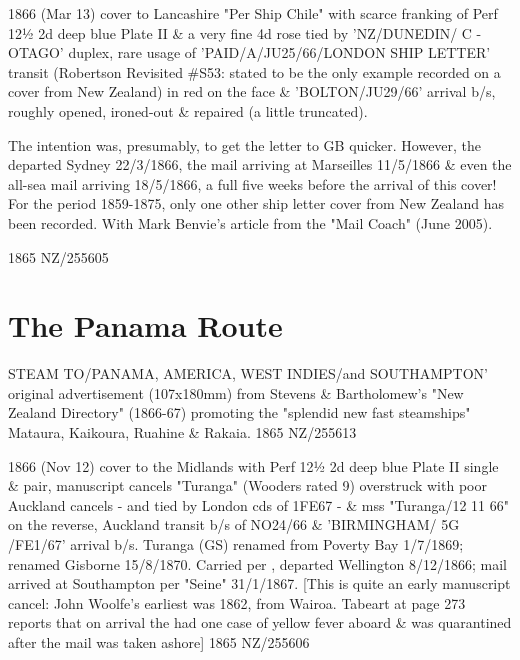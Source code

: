 \documentclass[justified]{tufte-book}
\begin{document}
%
{1866 (Mar 13) cover to Lancashire "Per Ship Chile" with scarce franking of Perf 12½ 2d deep blue Plate II \& a very fine 4d rose tied by 'NZ/DUNEDIN/ C - OTAGO' duplex, rare usage of 'PAID/A/JU25/66/LONDON SHIP LETTER' transit (Robertson Revisited \#S53: stated to be the only example recorded on a cover from New Zealand) in red on the face \& 'BOLTON/JU29/66' arrival b/s, roughly opened, ironed-out \& repaired (a little truncated). 

The intention was, presumably, to get the letter to GB quicker. However, the  departed Sydney 22/3/1866, the mail arriving at Marseilles 11/5/1866 \& even the all-sea mail arriving 18/5/1866, a full five weeks before the arrival of this cover! For the period 1859-1875, only one other ship letter cover from New Zealand has been recorded. With Mark Benvie's article from the "Mail Coach" (June 2005).}%
{1865}%
{NZ/255605}%
{}%
{}
{}%
{}%








\chapter{The Panama Route}
%
{STEAM TO/PANAMA, AMERICA, WEST INDIES/and SOUTHAMPTON' original advertisement (107x180mm) from Stevens \& Bartholomew's "New Zealand Directory" (1866-67) promoting the "splendid new fast steamships" Mataura, Kaikoura, Ruahine \& Rakaia. }%
{1865}%
{NZ/255613}%
{}%
{}
{}%
{}%


%
{1866 (Nov 12) cover to the Midlands with Perf 12½ 2d deep blue Plate II single \& pair, manuscript cancels "Turanga" (Wooders rated 9) overstruck with poor Auckland cancels - and tied by London cds of 1FE67 - \& mss "Turanga/12 11 66" on the reverse, Auckland transit b/s of NO24/66 \& 'BIRMINGHAM/ 5G /FE1/67' arrival b/s. Turanga (GS) renamed from Poverty Bay 1/7/1869; renamed Gisborne 15/8/1870. Carried per , departed Wellington 8/12/1866; mail arrived at Southampton per "Seine" 31/1/1867. [This is quite an early manuscript cancel: John Woolfe's earliest was 1862, from Wairoa. Tabeart at page 273 reports that on arrival the  had one case of yellow fever aboard \& was quarantined after the mail was taken ashore] }%
{1865}%
{NZ/255606}%
{}%
{}
{}%
{}
\end{document}
